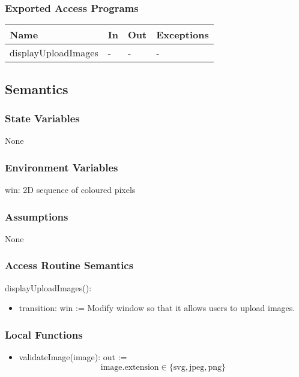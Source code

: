\documentclass[12pt, titlepage]{article}
\begin{document}
\subsubsection{Exported Access Programs}

\begin{center}
\begin{tabular}{p{3cm} p{4cm} p{4cm} p{2cm}}
\hline
\textbf{Name} & \textbf{In} & \textbf{Out} & \textbf{Exceptions} \\
\hline
displayUploadImages & - & - & - \\
\hline
\end{tabular}
\end{center}

\subsection{Semantics}

\subsubsection{State Variables}
None
\subsubsection{Environment Variables}
win: 2D sequence of coloured pixels

\subsubsection{Assumptions}
None

\subsubsection{Access Routine Semantics}

\noindent displayUploadImages():
\begin{itemize}
\item transition: win := Modify window so that it allows users to upload images.
\end{itemize}

\subsubsection{Local Functions}
\begin{itemize}
\item validateImage(image): out := \[
\text{image.extension} \in \{\text{svg}, \text{jpeg}, \text{png}\}
\]
\end{itemize}
\end{document}
